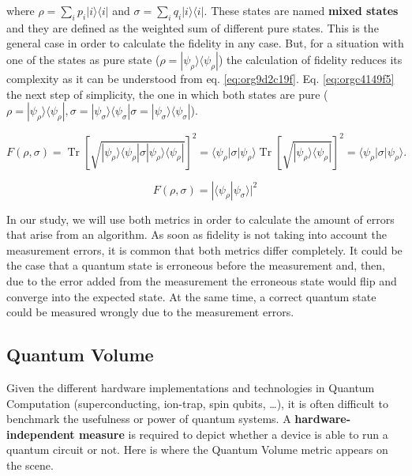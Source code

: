 where \(\rho =\sum _{i}p_{i}|i\rangle \langle i|\) and \(\sigma =\sum _{i}q_{i}|i\rangle \langle i|\).
These states are named \textbf{mixed states} and they are defined as the weighted sum of different pure states.
This is the general case in order to calculate the fidelity in any case.
But, for a situation with one of the states as pure state (\({\displaystyle \rho =|\psi _{\rho }\rangle \!\langle \psi _{\rho }|}\)) the calculation of fidelity reduces its complexity as it can be understood from eq. \ref{eq:org9d2c19f}.
Eq. \ref{eq:orgc4149f5} the next step of simplicity, the one in which both states are pure (\({\displaystyle \rho =|\psi _{\rho }\rangle \!\langle \psi _{\rho }|}, {\displaystyle \sigma =|\psi _{\sigma }\rangle \!\langle \psi _{\sigma }|} {\displaystyle \sigma =|\psi _{\sigma }\rangle \!\langle \psi _{\sigma }|}\)).


\begin{equation}
\label{eq:org9d2c19f}
{\displaystyle F(\rho ,\sigma )=\operatorname {Tr} \left[{\sqrt {|\psi _{\rho }\rangle \langle \psi _{\rho }|\sigma |\psi _{\rho }\rangle \langle \psi _{\rho }|}}\right]^{2}=\langle \psi _{\rho }|\sigma |\psi _{\rho }\rangle \operatorname {Tr} \left[{\sqrt {|\psi _{\rho }\rangle \langle \psi _{\rho }|}}\right]^{2}=\langle \psi _{\rho }|\sigma |\psi _{\rho }\rangle .}
\end{equation}

\begin{equation}
\label{eq:orgc4149f5}
{\displaystyle F(\rho ,\sigma )=|\langle \psi _{\rho }|\psi _{\sigma }\rangle |^{2}}
\end{equation}




In our study, we will use both metrics in order to calculate the amount of errors that arise from an algorithm.
As soon as fidelity is not taking into account the measurement errors, it is common that both metrics differ completely.
It could be the case that a quantum state is erroneous before the measurement and, then, due to the error added from the measurement the erroneous state would flip and converge into the expected state.
At the same time, a correct quantum state could be measured wrongly due to the measurement errors.

\subsection*{Quantum Volume}
\label{sec:orgacaf930}

Given the different hardware implementations and technologies in Quantum Computation (superconducting, ion-trap, spin qubits, \ldots{}), it is often difficult to benchmark the usefulness or power of quantum systems. 
A \textbf{hardware-independent measure} is required to depict whether a device is able to run a quantum circuit or not.
Here is where the Quantum Volume metric appears on the scene.

